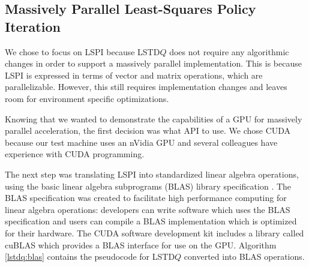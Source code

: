 \subsection{Massively Parallel Least-Squares Policy Iteration}

We chose to focus on LSPI because LSTD$Q$ does not require any algorithmic changes in order to support a massively parallel implementation. This is because LSPI is expressed in terms of vector and matrix operations, which are parallelizable. However, this still requires implementation changes and leaves room for environment specific optimizations.

Knowing that we wanted to demonstrate the capabilities of a GPU for massively parallel acceleration, the first decision was what API to use. We chose CUDA because our test machine uses an nVidia GPU and several colleagues have experience with CUDA programming.

The next step was translating LSPI into standardized linear algebra operations, using the basic linear algebra subprograms (BLAS) library specification \cite{blas}. The BLAS specification was created to facilitate high performance computing for linear algebra operations: developers can write software which uses the BLAS specification and users can compile a BLAS implementation which is optimized for their hardware. The CUDA software development kit includes a library called cuBLAS which provides a BLAS interface for use on the GPU. Algorithm \ref{lstdq:blas} contains the pseudocode for LSTD$Q$ converted into BLAS operations.

